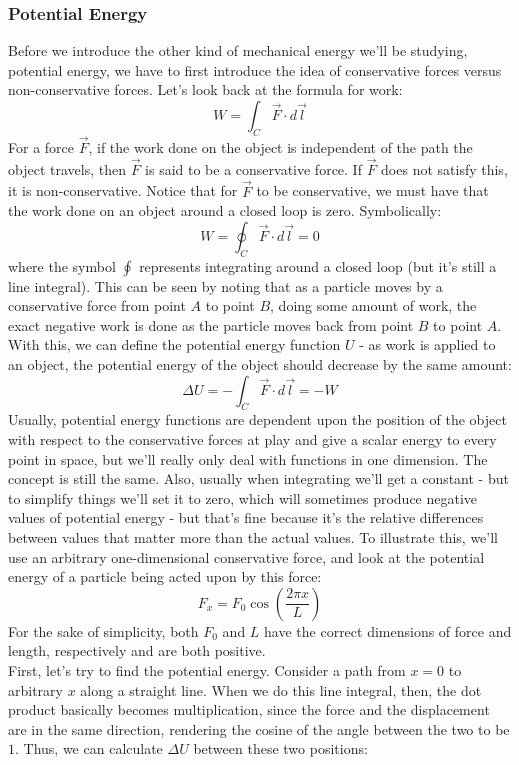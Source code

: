 \subsubsection{Potential Energy}
Before we introduce the other kind of mechanical energy we'll be studying, potential energy, we have to first introduce the idea of conservative forces versus non-conservative forces. Let's look back at the formula for work: 
\[
	W = \int_C \vec F \cdot d\vec l
\]
For a force $\vec F$, if the work done on the object is independent of the path the object travels, then $\vec F$ is said to be a conservative force. If $\vec F$ does not satisfy this, it is non-conservative. Notice that for $\vec F$ to be conservative, we must have that the work done on an object around a closed loop is zero. Symbolically:
\[
	W = \oint_C \vec F \cdot d\vec l = 0
\]
where the symbol $\oint$ represents integrating around a closed loop (but it's still a line integral). This can be seen by noting that as a particle moves by a conservative force from point $A$ to point $B$, doing some amount of work, the exact negative work is done as the particle moves back from point $B$ to point $A$. With this, we can define the potential energy function $U$ - as work is applied to an object, the potential energy of the object should decrease by the same amount:
\[
	\Delta U = - \int_C \vec F \cdot d\vec l = - W
\]
Usually, potential energy functions are dependent upon the position of the object with respect to the conservative forces at play and give a scalar energy to every point in space, but we'll really only deal with functions in one dimension. The concept is still the same. Also, usually when integrating we'll get a constant - but to simplify things we'll set it to zero, which will sometimes produce negative values of potential energy - but that's fine because it's the relative differences between values that matter more than the actual values. To illustrate this, we'll use an arbitrary one-dimensional conservative force, and look at the potential energy of a particle being acted upon by this force:
\[
	F_x = F_0 \cos \left(\frac{2\pi x}{L} \right)
\]
For the sake of simplicity, both $F_0$ and $L$ have the correct dimensions of force and length, respectively and are both positive.\\ First, let's try to find the potential energy. Consider a path from $x = 0$ to arbitrary $x$ along a straight line. When we do this line integral, then, the dot product basically becomes multiplication, since the force and the displacement are in the same direction, rendering the cosine of the angle between the two to be $1$. Thus, we can calculate $\Delta U$ between these two positions:
